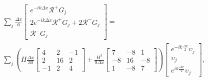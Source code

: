  \begin{multline*}
 \sum_j \frac{\Delta x}{6} \begin{bmatrix} e^{-ik\Delta x} \mathcal{R}^+ G_j \\2 e^{-ik\Delta x} \mathcal{R}^+G_j +2 \mathcal{R}^- G_j\\ \mathcal{R}^- G_j \end{bmatrix} = \\\sum_j \left(H\frac{\Delta x}{30}\begin{bmatrix} 4 &2 &-1 \\2 &16 &2  \\-1 &2 &4 \end{bmatrix} + \frac{H^3 }{9\Delta x}\begin{bmatrix} 7 &-8 &1  \\-8 &16 &-8  \\1 &-8 &7  \end{bmatrix} \right) \begin{bmatrix} e^{-ik\frac{\Delta x}{2}}\upsilon_{j} \\\upsilon_{j} \\ e^{ik\frac{\Delta x}{2}}\upsilon_{j} \end{bmatrix},
 \end{multline*}
 
